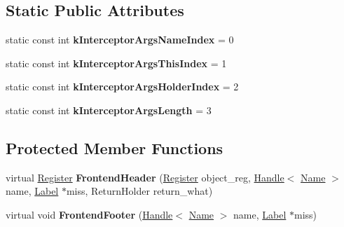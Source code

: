 \subsection*{Static Public Attributes}
\begin{DoxyCompactItemize}
\item 
static const int {\bfseries k\+Interceptor\+Args\+Name\+Index} = 0\hypertarget{classv8_1_1internal_1_1_named_load_handler_compiler_a10e312b3b7e04901a0235d57be68e189}{}\label{classv8_1_1internal_1_1_named_load_handler_compiler_a10e312b3b7e04901a0235d57be68e189}

\item 
static const int {\bfseries k\+Interceptor\+Args\+This\+Index} = 1\hypertarget{classv8_1_1internal_1_1_named_load_handler_compiler_a36622c1a3c3fd9469e1195465ae39d9e}{}\label{classv8_1_1internal_1_1_named_load_handler_compiler_a36622c1a3c3fd9469e1195465ae39d9e}

\item 
static const int {\bfseries k\+Interceptor\+Args\+Holder\+Index} = 2\hypertarget{classv8_1_1internal_1_1_named_load_handler_compiler_a83c9799650b422af9e4d82fb01b898b5}{}\label{classv8_1_1internal_1_1_named_load_handler_compiler_a83c9799650b422af9e4d82fb01b898b5}

\item 
static const int {\bfseries k\+Interceptor\+Args\+Length} = 3\hypertarget{classv8_1_1internal_1_1_named_load_handler_compiler_abc10b90f6abcb5b3c8ae82addd6499c0}{}\label{classv8_1_1internal_1_1_named_load_handler_compiler_abc10b90f6abcb5b3c8ae82addd6499c0}

\end{DoxyCompactItemize}
\subsection*{Protected Member Functions}
\begin{DoxyCompactItemize}
\item 
virtual \hyperlink{structv8_1_1internal_1_1_register}{Register} {\bfseries Frontend\+Header} (\hyperlink{structv8_1_1internal_1_1_register}{Register} object\+\_\+reg, \hyperlink{classv8_1_1internal_1_1_handle}{Handle}$<$ \hyperlink{classv8_1_1internal_1_1_name}{Name} $>$ name, \hyperlink{classv8_1_1internal_1_1_label}{Label} $\ast$miss, Return\+Holder return\+\_\+what)\hypertarget{classv8_1_1internal_1_1_named_load_handler_compiler_a2b08c72fc1d96a3bc9b44fc2318d51c6}{}\label{classv8_1_1internal_1_1_named_load_handler_compiler_a2b08c72fc1d96a3bc9b44fc2318d51c6}

\item 
virtual void {\bfseries Frontend\+Footer} (\hyperlink{classv8_1_1internal_1_1_handle}{Handle}$<$ \hyperlink{classv8_1_1internal_1_1_name}{Name} $>$ name, \hyperlink{classv8_1_1internal_1_1_label}{Label} $\ast$miss)\hypertarget{classv8_1_1internal_1_1_named_load_handler_compiler_a377b8a231a1b049f808a0870929c837f}{}\label{classv8_1_1internal_1_1_named_load_handler_compiler_a377b8a231a1b049f808a0870929c837f}

\end{DoxyCompactItemize}
